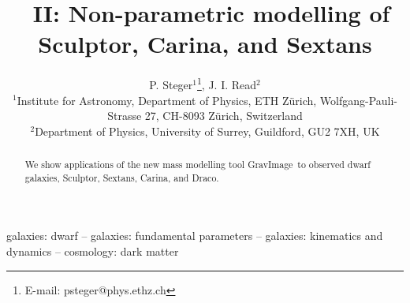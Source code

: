 \documentclass[useAMS,usenatbib]{mn2e}
\title[\GravImage\ III: Mass modelling of dSph]{\GravImage\ II:
  Non-parametric modelling of Sculptor, Carina, and Sextans}
\author[Steger]{P. Steger$^1$\thanks{E-mail: psteger@phys.ethz.ch}, J. I. Read$^{2}$\\
$^1$Institute for Astronomy, Department of Physics, ETH Z\"urich, Wolfgang-Pauli-Strasse 27, CH-8093 Z\"urich, Switzerland\\
$^2$Department of Physics, University of Surrey, Guildford, GU2 7XH, UK
}
\def\GravImage{{\sc GravImage}}
\begin{document}
\maketitle

\begin{abstract}
    We show applications of the new mass modelling tool \GravImage\ to
    observed dwarf galaxies, Sculptor, Sextans, Carina, and Draco.
\end{abstract}

\begin{keywords} galaxies: dwarf -- galaxies: fundamental parameters
    -- galaxies: kinematics and dynamics -- cosmology: dark matter
\end{keywords}











\end{document}
